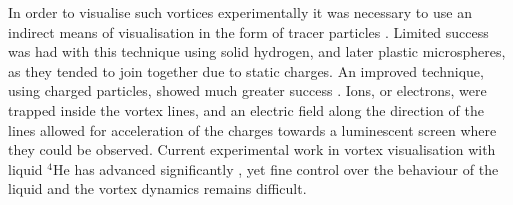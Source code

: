 In order to visualise such vortices experimentally it was necessary to use an indirect means of visualisation in the form of tracer particles \cite{BEC:Packard_physb_1982}. Limited success was had with this technique using solid hydrogen, and later plastic microspheres, as they tended to join together due to static charges. An improved technique, using charged particles, showed much greater success \cite{Vtx:Packard_prl_1969}. Ions, or electrons, were trapped inside the vortex lines, and an electric field along the direction of the lines allowed for acceleration of the charges towards a luminescent screen where they could be observed. Current experimental work in vortex visualisation with liquid $^4$He has advanced significantly \cite{Vtx:Tsubota_arxiv_2010,Vtx:Guo_pnas_2014}, yet fine control over the behaviour of the liquid and the vortex dynamics remains difficult.

